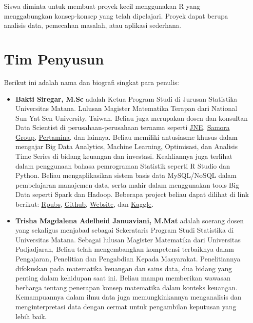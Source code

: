 \documentclass[
]{book}
\providecommand{\tightlist}{%
  \setlength{\itemsep}{0pt}\setlength{\parskip}{0pt}}
\begin{document}
Siswa diminta untuk membuat proyek kecil menggunakan R yang menggabungkan konsep-konsep yang telah dipelajari. Proyek dapat berupa analisis data, pemecahan masalah, atau aplikasi sederhana.

\hypertarget{tim-penyusun}{%
\section*{Tim Penyusun}\label{tim-penyusun}}

Berikut ini adalah nama dan biografi singkat para penulis:

\begin{itemize}
\tightlist
\item
  \textbf{Bakti Siregar, M.Sc} adalah Ketua Program Studi di Jurusan Statistika Universitas Matana. Lulusan Magister Matematika Terapan dari National Sun Yat Sen University, Taiwan. Beliau juga merupakan dosen dan konsultan Data Scientist di perusahaan-perusahaan ternama seperti \href{https://www.jne.co.id/id/beranda}{JNE}, \href{https://www.samoragroup.co.id/home/en}{Samora Group}, \href{https://www.pertamina.com/}{Pertamina}, dan lainnya. Beliau memiliki antusiasme khusus dalam mengajar Big Data Analytics, Machine Learning, Optimisasi, dan Analisis Time Series di bidang keuangan dan investasi. Keahliannya juga terlihat dalam penggunaan bahasa pemrograman Statistik seperti R Studio dan Python. Beliau mengaplikasikan sistem basis data MySQL/NoSQL dalam pembelajaran manajemen data, serta mahir dalam menggunakan tools Big Data seperti Spark dan Hadoop. Beberapa project beliau dapat dilihat di link berikut: \href{https://rpubs.com/dsciencelabs}{Rpubs}, \href{https://github.com/dsciencelabs}{Github}, \href{https://dsciencelabs.github.io/web/index.html}{Website}, dan \href{https://www.kaggle.com/baktisiregar/code}{Kaggle}.
\end{itemize}

\begin{itemize}
\tightlist
\item
  \textbf{Trisha Magdalena Adelheid Januaviani, M.Mat} adalah soerang dosen yang sekaligus menjabad sebagai Sekerataris Program Studi Statistika di Universitas Matana. Sebagai lulusan Magister Matematika dari Universitas Padjadjaran, Beliau telah mengembangkan kompetensi terbaiknya dalam Pengajaran, Penelitian dan Pengabdian Kepada Masyarakat. Penelitiannya difokuskan pada matematika keuangan dan sains data, dua bidang yang penting dalam kehidupan saat ini. Beliau mampu memberikan wawasan berharga tentang penerapan konsep matematika dalam konteks keuangan. Kemampuannya dalam ilmu data juga memungkinkannya menganalisis dan menginterpretasi data dengan cermat untuk pengambilan keputusan yang lebih baik.
\end{itemize}
\end{document}
